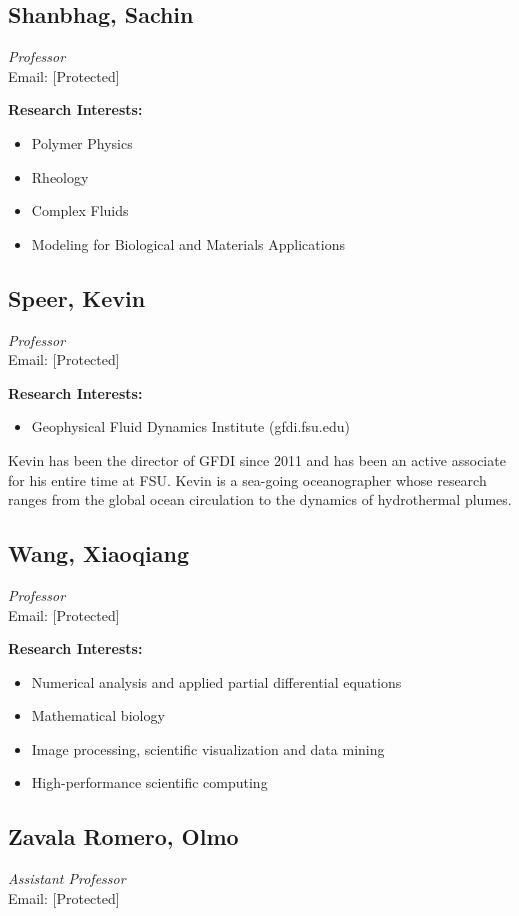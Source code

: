 \documentclass[12pt,a4paper]{article}
\begin{document}
\subsection{Shanbhag, Sachin}
\textit{Professor} \\
Email: [Protected]

\textbf{Research Interests:}
\begin{itemize}
    \item Polymer Physics
    \item Rheology
    \item Complex Fluids
    \item Modeling for Biological and Materials Applications
\end{itemize}

\subsection{Speer, Kevin}
\textit{Professor} \\
Email: [Protected]

\textbf{Research Interests:}
\begin{itemize}
    \item Geophysical Fluid Dynamics Institute (gfdi.fsu.edu)
\end{itemize}

Kevin has been the director of GFDI since 2011 and has been an active associate for his entire time at FSU. Kevin is a sea-going oceanographer whose research ranges from the global ocean circulation to the dynamics of hydrothermal plumes.

\subsection{Wang, Xiaoqiang}
\textit{Professor} \\
Email: [Protected]

\textbf{Research Interests:}
\begin{itemize}
    \item Numerical analysis and applied partial differential equations
    \item Mathematical biology
    \item Image processing, scientific visualization and data mining
    \item High-performance scientific computing
\end{itemize}

\subsection{Zavala Romero, Olmo}
\textit{Assistant Professor} \\
Email: [Protected]
\end{document}
